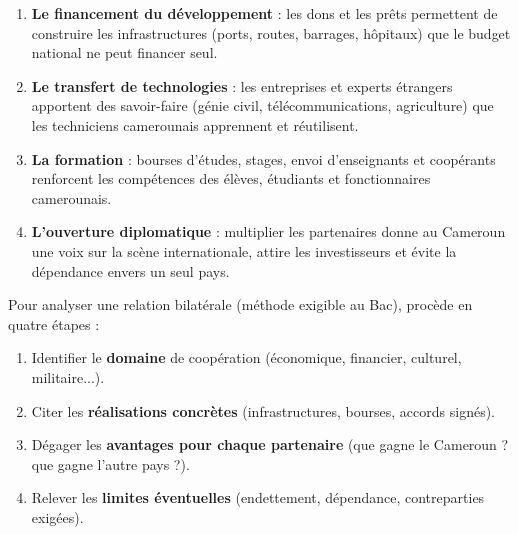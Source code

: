 \documentclass[11pt]{article}
\begin{document}
\begin{enumerate}
\item \textbf{Le financement du développement} : les dons et les prêts permettent de construire les infrastructures (ports, routes, barrages, hôpitaux) que le budget national ne peut financer seul.
\item \textbf{Le transfert de technologies} : les entreprises et experts étrangers apportent des savoir-faire (génie civil, télécommunications, agriculture) que les techniciens camerounais apprennent et réutilisent.
\item \textbf{La formation} : bourses d'études, stages, envoi d'enseignants et coopérants renforcent les compétences des élèves, étudiants et fonctionnaires camerounais.
\item \textbf{L'ouverture diplomatique} : multiplier les partenaires donne au Cameroun une voix sur la scène internationale, attire les investisseurs et évite la dépendance envers un seul pays.
\end{enumerate}

\begin{methode}
Pour analyser une relation bilatérale (méthode exigible au Bac), procède en quatre étapes :
\begin{enumerate}
\item Identifier le \textbf{domaine} de coopération (économique, financier, culturel, militaire...).
\item Citer les \textbf{réalisations concrètes} (infrastructures, bourses, accords signés).
\item Dégager les \textbf{avantages pour chaque partenaire} (que gagne le Cameroun ? que gagne l'autre pays ?).
\item Relever les \textbf{limites éventuelles} (endettement, dépendance, contreparties exigées).
\end{enumerate}
\end{methode}
\end{document}
